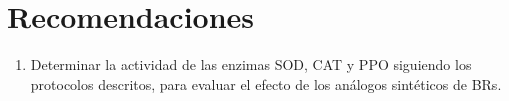 
\chapter{Recomendaciones}


\begin{enumerate}
\item Determinar la actividad de las enzimas SOD, CAT y PPO siguiendo los protocolos descritos, para evaluar el efecto de los an\'alogos sint\'eticos de BRs.
\end{enumerate}

















